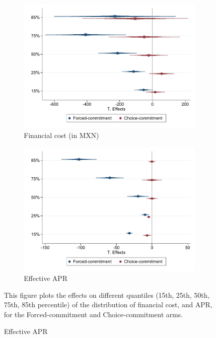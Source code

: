 \documentclass[oneside,11pt]{article}
\begin{document}
\begin{figure}[H]
     \caption{Quantile regressions}
    \label{qregs}
    \begin{center}
    \begin{subfigure}{.45\textwidth}
      \caption{Financial cost (in MXN)}
        \centering
        \includegraphics[width=\textwidth]{Figuras/qreg_fc_admin.pdf}
    \end{subfigure}
     \begin{subfigure}{0.45\textwidth}
    \caption{Effective APR}
       \centering
      \includegraphics[width=\textwidth]{Figuras/qreg_apr.pdf}
    \end{subfigure}
    \end{center}
         \scriptsize
     This figure plots the effects on different quantiles (15th, 25th, 50th, 75th, 85th percentile) of the distribution of financial cost, and APR, for the Forced-commitment and Choice-commitment arms.
\end{figure}
\end{document}
